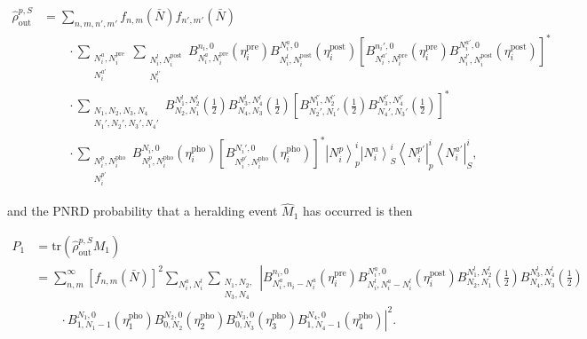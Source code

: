 \documentclass[aps,twocolumn,secnumarabic,amsmath,amssymb,pra,groupedaddress,
showpacs, showkeys]{revtex4-1}
\newcommand{\bra}[1]{\left\langle #1 \right|}
\newcommand{\ket}[1]{\left|#1\right\rangle}
\newcommand{\pna}[1]{\left(#1\right)}
\newcommand{\pnb}[1]{\left[#1\right]}
\begin{document}
\begin{widetext}
\begin{align}
	\hat{\rho}_{\textrm{out}}^{p,S} & = \sum_{n,m,n',m'} f_{n,m}\pna{\bar{N}} f_{n',m'}\pna{\bar{N}} \nonumber \\
	& \qquad \cdot\sum_{\substack{N_i^a,N_i^{\textrm{pre}}\\ N_i^{a\prime} }} \sum_{\substack{N_i^l,N_i^{\textrm{post}}\\ N_i^{l\prime} }}
	B_{N_i^a,N_i^{\textrm{pre}}}^{n_i,0}\pna{\eta_i^{\textrm{pre}}} B_{N_i^l,N_i^{\textrm{post}}}^{N_i^a,0}\pna{\eta_i^{\textrm{post}}} \pnb{B_{N_i^{a\prime},N_i^{\textrm{pre}}}^{n_i',0}\pna{\eta_i^{\textrm{pre}}} B_{N_i^{l\prime},N_i^{\textrm{post}}}^{N_i^{a\prime},0}\pna{\eta_i^{\textrm{post}}}}^{*} \nonumber \\
	& \qquad \cdot \sum_{\substack{N_1,N_2,N_3,N_4\\ N_1',N_2',N_3',N_4'}}
	 B_{N_2,N_1}^{N_1^l,N_2^l}\pna{\frac{1}{2}} B_{N_4,N_3}^{N_3^l,N_4^l}\pna{\frac{1}{2}} \pnb{B_{N_2',N_1'}^{N_1^{l\prime},N_2^{l\prime}}\pna{\frac{1}{2}} B_{N_4',N_3'}^{N_3^{l\prime},N_4^{l\prime}}\pna{\frac{1}{2}}}^{*}\nonumber \\
	& \qquad \cdot \sum_{\substack{N_i^p,N_i^{\textrm{pho}}\\ N_i^{p\prime} }}
	 B_{N_i^p,N_i^{\textrm{pho}}}^{N_i,0}\pna{\eta_i^{\textrm{pho}}} \pnb{B_{N_i^{p\prime},N_i^{\textrm{pho}}}^{N_i',0}\pna{\eta_i^{\textrm{pho}}}}^{*} \ket{N_i^p}_{p}^i \ket{N_i^a}_{S}^i \bra{N_i^{p\prime}}_{p}^i \bra{N_i^{a\prime}}_{S}^i,
\end{align}
\end{widetext}
and the PNRD probability that a heralding event $\hat{M}_{1}$ has occurred is
then
\begin{widetext}
\begin{align}
	P_{1}& =\textrm{tr}\pna{\hat{\rho}_{\textrm{out}}^{p,S} M_{1}}\nonumber \\
	& = \sum_{n,m}^{\infty} \pnb{f_{n,m}\pna{\bar{N}} }^2 \sum_{N_i^a,N_i^l} \sum_{\substack{N_1,N_2,\\N_3,N_4}} \left|B_{N_i^a,n_i-N_i^a}^{n_i,0}\pna{\eta_i^{\textrm{pre}}}  
	B_{N_i^l,N_i^a-N_i^l}^{N_i^a,0}\pna{\eta_i^{\textrm{post}}}  B_{N_2,N_1}^{N_1^l,N_2^l}\pna{\frac{1}{2}} B_{N_4,N_3}^{N_3^l,N_4^l}\pna{\frac{1}{2}}\right.\nonumber \\
	& \left.\qquad \cdot B_{1,N_1-1}^{N_1,0}\pna{\eta_1^{\textrm{pho}}}
	 		B_{0,N_2}^{N_2,0}\pna{\eta_2^{\textrm{pho}}}
	 		B_{0,N_3}^{N_3,0}\pna{\eta_3^{\textrm{pho}}}
			B_{1,N_4-1}^{N_4,0}\pna{\eta_4^{\textrm{pho}}}\right|^2.
\end{align}
\end{widetext}
\end{document}
